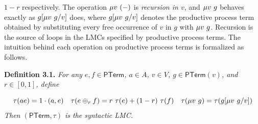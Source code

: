 \documentclass[11pt,a4paper]{amsart}
\begin{document}
\hypertarget{html:S3.SS0.SSS0.Px1.p2.m12}{}\({1-r}\) respectively. The operation %
\hypertarget{html:S3.SS0.SSS0.Px1.p2.m13}{}\({\mu v\leavevmode\nobreak\ (-)}\) is \emph{recursion in %
\hypertarget{html:S3.SS0.SSS0.Px1.p2.m14}{}\({v}\)}, and %
\hypertarget{html:S3.SS0.SSS0.Px1.p2.m15}{}\({\mu v\leavevmode\nobreak\ g}\) behaves exactly as %
\hypertarget{html:S3.SS0.SSS0.Px1.p2.m16}{}\({g[\mu v\leavevmode\nobreak\ g/v]}\) does, where %
\hypertarget{html:S3.SS0.SSS0.Px1.p2.m17}{}\({g[\mu v\leavevmode\nobreak\ g/v]}\) denotes the productive process term obtained by substituting every free occurrence of %
\hypertarget{html:S3.SS0.SSS0.Px1.p2.m18}{}\({v}\) in %
\hypertarget{html:S3.SS0.SSS0.Px1.p2.m19}{}\({g}\) with %
\hypertarget{html:S3.SS0.SSS0.Px1.p2.m20}{}\({\mu v\leavevmode\nobreak\ g}\). Recursion is the source of loops in the LMCs specified by productive process terms. The intuition behind each operation on productive process terms is formalized as follows.
\par\medskip
\hypertarget{html:S3.Thmtheorem1}{} \par\noindent\textbf{\textbf{Definition 3.1}\textbf{.}}\quad  %
\hypertarget{html:S3.Thmtheorem1.p1}{} \emph{For any %
\hypertarget{html:S3.Thmtheorem1.p1.m1}{}\({e,f\in\mathsf{PTerm}}\), %
\hypertarget{html:S3.Thmtheorem1.p1.m2}{}\({a\in A}\), %
\hypertarget{html:S3.Thmtheorem1.p1.m3}{}\({v\in V}\), %
\hypertarget{html:S3.Thmtheorem1.p1.m4}{}\({g\in\mathsf{PTerm}(v)}\), and %
\hypertarget{html:S3.Thmtheorem1.p1.m5}{}\({r\in[0,1]}\), define}
\par\medskip
\hypertarget{html:S8.EGx2}{} %
\hypertarget{html:S3.Ex2}{}  %
\hypertarget{html:S3.Ex2.m1}{}\[\displaystyle\tau(ae)=1\cdot(a,e)\quad\tau(e\oplus_{r}f)=r\leavevmode\nobreak\ \tau(e)+(1-r)\leavevmode\nobreak\ \tau(f)\quad\tau(\mu v\leavevmode\nobreak\ g)=\tau(g[\mu v\leavevmode\nobreak\ g/v])\]    \emph{Then %
\hypertarget{html:S3.Thmtheorem1.p1.m6}{}\({(\mathsf{PTerm},\tau)}\) is the \emph{syntactic LMC}.}
\end{document}
